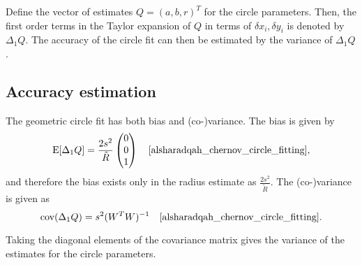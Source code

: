 Define the vector of estimates $Q = (a, b, r)^T$ for the circle parameters. Then, the first order terms in the Taylor expansion of $Q$ in terms of $\delta x_i, \delta y_i$ is denoted by $\Delta_1Q$. The accuracy of the circle fit can then be estimated by the variance of $\Delta_1Q$ \cite[section 2]{alsharadqah_chernov_circle_fitting}.

\subsection{Accuracy estimation}
The geometric circle fit has both bias and (co-)variance. The bias is given by
\begin{equation}
    \text{E}[\Delta_1 Q] = \frac{2s^2}{\tilde{R}} \begin{pmatrix} 0 \\ 0 \\ 1 \end{pmatrix} \quad \text{\cite[equation 6.14]{alsharadqah_chernov_circle_fitting}},
\end{equation}
and therefore the bias exists only in the radius estimate as $\frac{2s^2}{\tilde{R}}$. The (co-)variance is given as
\begin{equation}
    \text{cov}(\Delta_1 Q) = s^2 (W^T W)^{-1} \quad \text{\cite[equation 8.12]{alsharadqah_chernov_circle_fitting}}.
\end{equation}

Taking the diagonal elements of the covariance matrix gives the variance of the estimates for the circle parameters. 